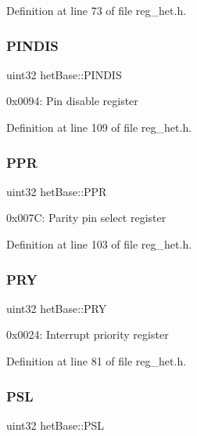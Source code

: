 Definition at line 73 of file reg\+\_\+het.\+h.

\mbox{\label{structhetBase_a1e8bd02d465ee5d73bf214cb5170b978}} 
\subsubsection{\texorpdfstring{P\+I\+N\+D\+IS}{PINDIS}}
{\footnotesize\ttfamily uint32 het\+Base\+::\+P\+I\+N\+D\+IS}

0x0094\+: Pin disable register 

Definition at line 109 of file reg\+\_\+het.\+h.

\mbox{\label{structhetBase_a41677184aeb9a257cd4b7f16eeb2a061}} 
\subsubsection{\texorpdfstring{P\+PR}{PPR}}
{\footnotesize\ttfamily uint32 het\+Base\+::\+P\+PR}

0x007C\+: Parity pin select register 

Definition at line 103 of file reg\+\_\+het.\+h.

\mbox{\label{structhetBase_adb41df05bfb1d2a610f3ad458a59c0cf}} 
\subsubsection{\texorpdfstring{P\+RY}{PRY}}
{\footnotesize\ttfamily uint32 het\+Base\+::\+P\+RY}

0x0024\+: Interrupt priority register 

Definition at line 81 of file reg\+\_\+het.\+h.

\mbox{\label{structhetBase_a846a271273e37a1d176440c6fe20b91c}} 
\subsubsection{\texorpdfstring{P\+SL}{PSL}}
{\footnotesize\ttfamily uint32 het\+Base\+::\+P\+SL}

